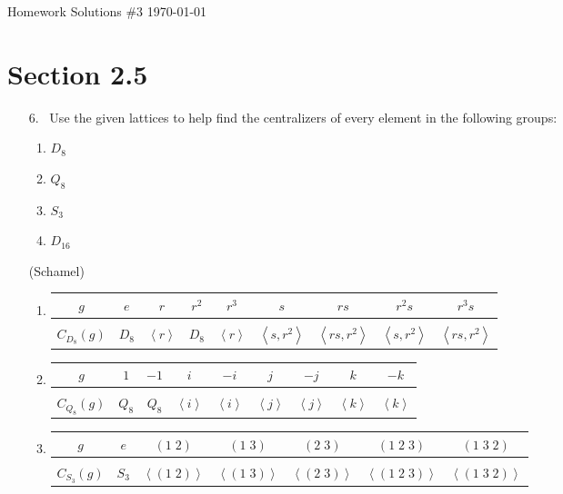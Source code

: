 \documentclass[10pt]{article}
\theoremstyle{plain}
\newcommand{\gen}[1]{\left\langle #1 \right\rangle}
\newcommand\header{{\sc 631 Homework Solutions \#3 \hfill \today}}
\begin{document}
\header


\section*{Section 2.5}

\begin{itemize}

\item[6.] \ Use the given lattices to help find the centralizers of every element in the following groups:
\begin{enumerate}
\item $D_8$
\item $Q_8$
\item $S_3$
\item $D_{16}$
\end{enumerate}
(Schamel)
\begin{enumerate}
\item \noindent
\begin{center}
\begin{tabular}{c|cccccccc}
$g $&  $e$ & $r$&$r^2$&$r^3$&$s$&$rs$&$r^2s$&$r^3s$ \\
\hline \\
$C_{D_8}(g)$ & $D_8$ & $\gen{r}$&$D_8$&$\gen{r}$&$\gen{s,r^2}$&$\gen{rs,r^2}$&$\gen{s,r^2}$&$\gen{rs,r^2}$\\
\end{tabular}
\end{center}
\item \noindent
\begin{center}
\begin{tabular}{c|cccccccc}
$g $&  $1$ & $-1$&$i$&$-i$&$j$&$-j$&$k$&$-k$ \\
\hline \\
$C_{Q_8}(g)$ & $Q_8$ & $Q_8$&$\gen{i}$&$\gen{i}$&$\gen{j}$&$\gen{j}$&$\gen{k}$&$\gen{k}$\\
\end{tabular}
\end{center}
\item \noindent
\begin{center}
\begin{tabular}{c|cccccc}
$g $&  $e$ & $(1\;2)$&$(1\;3)$&$(2\;3)$&$(1\;2\;3)$&$(1\;3\;2)$ \\
\hline \\
$C_{S_3}(g)$ & $S_3$ & $\gen{(1\;2)}$&$\gen{(1\;3)}$&$\gen{(2\;3)}$&$\gen{(1\;2\;3)}$&$\gen{(1\;3\;2)}$\\

\end{tabular}
\end{center}
\end{enumerate}
\end{itemize}
\end{document}
